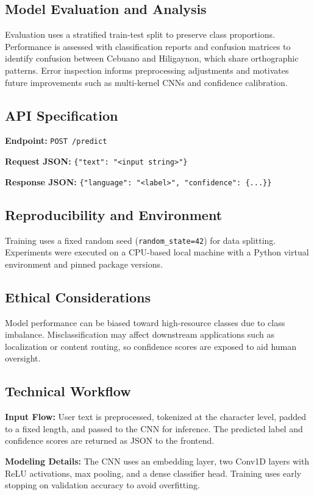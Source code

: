 \documentclass[conference]{IEEEtran}
\begin{document}
\subsection{Model Evaluation and Analysis}
Evaluation uses a stratified train-test split to preserve class proportions. Performance is assessed with classification reports and confusion matrices to identify confusion between Cebuano and Hiligaynon, which share orthographic patterns. Error inspection informs preprocessing adjustments and motivates future improvements such as multi-kernel CNNs and confidence calibration.

\subsection{API Specification}
\textbf{Endpoint:} \texttt{POST /predict}

\textbf{Request JSON:} \texttt{\{"text": "<input string>"\}}

\textbf{Response JSON:} \texttt{\{"language": "<label>", "confidence": \{...\}\}}

\subsection{Reproducibility and Environment}
Training uses a fixed random seed (\texttt{random\_state=42}) for data splitting. Experiments were executed on a CPU-based local machine with a Python virtual environment and pinned package versions.

\subsection{Ethical Considerations}
Model performance can be biased toward high-resource classes due to class imbalance. Misclassification may affect downstream applications such as localization or content routing, so confidence scores are exposed to aid human oversight.

\subsection{Technical Workflow}
\textbf{Input Flow:} User text is preprocessed, tokenized at the character level, padded to a fixed length, and passed to the CNN for inference. The predicted label and confidence scores are returned as JSON to the frontend.

\textbf{Modeling Details:} The CNN uses an embedding layer, two Conv1D layers with ReLU activations, max pooling, and a dense classifier head. Training uses early stopping on validation accuracy to avoid overfitting.
\end{document}
